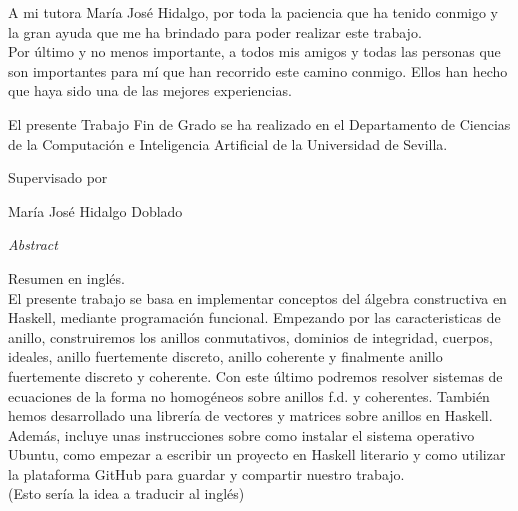 \documentclass[a4paper,12pt,twoside]{book}
\begin{document}
\begin{titlepage}
\begin{flushright}
\begin{minipage}{8.45cm}
      A mi tutora María José Hidalgo, por toda la paciencia que ha tenido conmigo y la gran 
      ayuda que me ha brindado para poder realizar este trabajo.\\

      Por último y no menos importante, a todos mis amigos y todas las 
      personas que son importantes para mí que han recorrido este camino 
      conmigo. Ellos han hecho que haya sido una de las mejores experiencias.
       
    \end{minipage}

      \vspace*{7.5mm}
      
      
  \end{flushright}
  \vspace*{\fill}

  \newpage


  
  \begin{center}
   \vspace*{5cm}
    \begin{minipage}{14cm}
      El presente Trabajo Fin de Grado se ha realizado en el Departamento de
      Ciencias de la Computación e Inteligencia Artificial de la Universidad de
      Sevilla.

      \vspace*{7.5mm}

      Supervisado por
    \end{minipage}\par
    María José Hidalgo Doblado
    \end{center}
  \vspace*{\fill}

  \newpage

  \vspace*{3cm}
  {\huge \textit{Abstract}}

  \vspace{2cm}
  Resumen en inglés.\\
  El presente trabajo se basa en implementar conceptos del álgebra constructiva en Haskell, mediante programación funcional. Empezando por las caracteristicas de anillo, construiremos los anillos conmutativos, dominios de integridad, cuerpos, ideales, anillo fuertemente discreto, anillo coherente y finalmente anillo fuertemente discreto y coherente. Con este último podremos resolver sistemas de ecuaciones de la forma no homogéneos sobre anillos f.d. y coherentes. También hemos desarrollado una librería de vectores y matrices sobre anillos en Haskell. Además, incluye unas instrucciones sobre como instalar el sistema operativo Ubuntu, como empezar a escribir un proyecto en Haskell literario y como utilizar la plataforma GitHub para guardar y compartir nuestro trabajo.\\
(Esto sería la idea a traducir al inglés)
  
\end{titlepage}
\newpage
\end{document}
